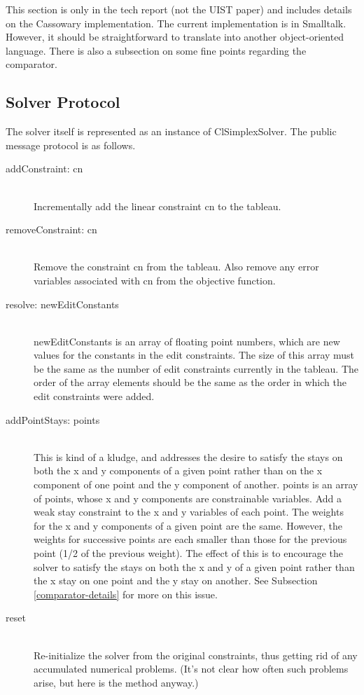\documentclass{article}
\begin{document}
This section is only in the tech report (not the UIST paper) and includes
details on the Cassowary implementation.  The current implementation is in
Smalltalk.  However, it should be straightforward to translate into another
object-oriented language.  There is also a subsection on some fine points
regarding the comparator.

\subsection{Solver Protocol}
\label{solver-protocol}

The solver itself is represented as an instance of {\sf ClSimplexSolver}.
The public message protocol is as follows.

\begin{description}

\item[{\sf addConstraint: cn}] \ \\
Incrementally add the linear constraint {\sf cn} to the tableau.

\item[{\sf removeConstraint: cn}] \ \\
Remove the constraint {\sf cn} from the tableau.  Also remove 
any error variables associated with {\sf cn} from the objective function.

\item[{\sf resolve: newEditConstants}] \ \\
{\sf newEditConstants} is an array
of floating point numbers, which are new values for the constants in
the edit constraints.  The size of this array must be the same as the
number of edit constraints currently in the tableau.  The order of the
array elements should be the same as the order in which the edit
constraints were added.

\item[{\sf addPointStays: points}] \ \\
This is kind of a kludge, and addresses the desire to satisfy the stays
on both the {\sf x} and {\sf y} components of a given point rather than
on the {\sf x} component of one point and the {\sf y} component of another.
{\sf points} is an array of points, whose {\sf x} and {\sf y} components
are constrainable variables.  Add a weak stay constraint to the {\sf x}
and {\sf y} variables of each point.  The weights for the {\sf x} and
{\sf y} components of a given point are the same.  However, the weights
for successive points are each smaller than those for the previous
point (1/2 of the previous weight).  The effect of this is to encourage the
solver to satisfy the stays on both the {\sf x} and {\sf y} of a given
point rather than the {\sf x} stay on one point and the {\sf y} stay on
another.  See Subsection \ref{comparator-details} for more on this issue.

\item[{\sf reset}] \ \\
Re-initialize the solver from the original constraints,
thus getting rid of any accumulated numerical problems.  (It's not clear
how often such problems arise, but here is the method anyway.)

\end{description}
\end{document}

